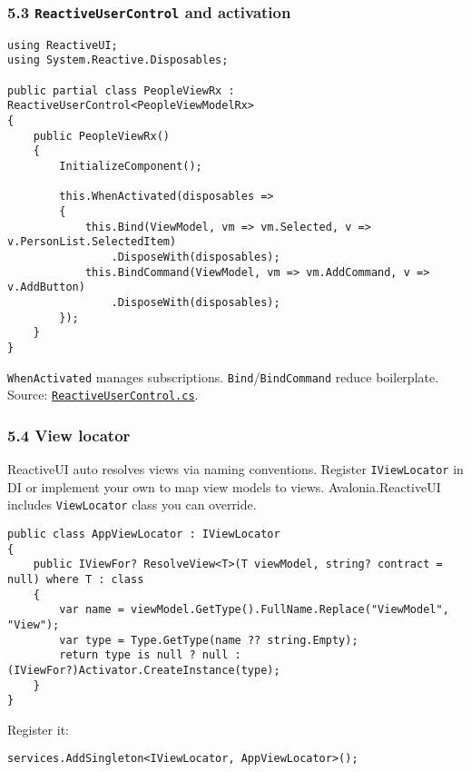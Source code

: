\subsubsection{\texorpdfstring{5.3 \texttt{ReactiveUserControl} and
activation}{5.3 ReactiveUserControl and activation}}\label{reactiveusercontrol-and-activation}

\begin{lstlisting}
using ReactiveUI;
using System.Reactive.Disposables;

public partial class PeopleViewRx : ReactiveUserControl<PeopleViewModelRx>
{
    public PeopleViewRx()
    {
        InitializeComponent();

        this.WhenActivated(disposables =>
        {
            this.Bind(ViewModel, vm => vm.Selected, v => v.PersonList.SelectedItem)
                .DisposeWith(disposables);
            this.BindCommand(ViewModel, vm => vm.AddCommand, v => v.AddButton)
                .DisposeWith(disposables);
        });
    }
}
\end{lstlisting}

\passthrough{\lstinline!WhenActivated!} manages subscriptions.
\passthrough{\lstinline!Bind!}/\passthrough{\lstinline!BindCommand!}
reduce boilerplate. Source:
\href{https://github.com/AvaloniaUI/Avalonia/blob/master/src/Avalonia.ReactiveUI/ReactiveUserControl.cs}{\passthrough{\lstinline!ReactiveUserControl.cs!}}.

\subsubsection{5.4 View locator}\label{view-locator}

ReactiveUI auto resolves views via naming conventions. Register
\passthrough{\lstinline!IViewLocator!} in DI or implement your own to
map view models to views. Avalonia.ReactiveUI includes
\passthrough{\lstinline!ViewLocator!} class you can override.

\begin{lstlisting}
public class AppViewLocator : IViewLocator
{
    public IViewFor? ResolveView<T>(T viewModel, string? contract = null) where T : class
    {
        var name = viewModel.GetType().FullName.Replace("ViewModel", "View");
        var type = Type.GetType(name ?? string.Empty);
        return type is null ? null : (IViewFor?)Activator.CreateInstance(type);
    }
}
\end{lstlisting}

Register it:

\begin{lstlisting}
services.AddSingleton<IViewLocator, AppViewLocator>();
\end{lstlisting}

